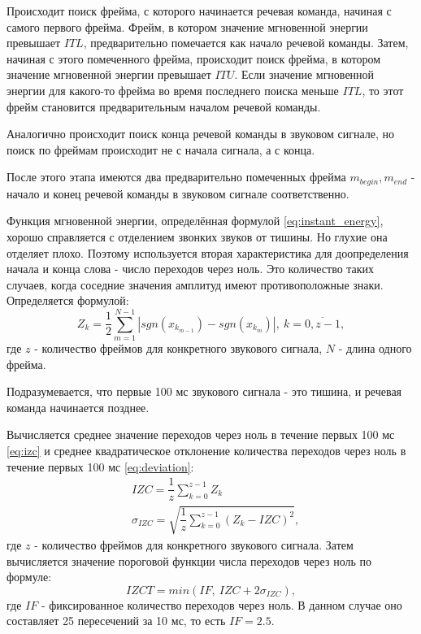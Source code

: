 Происходит поиск фрейма, с которого начинается речевая команда, начиная с самого первого фрейма. Фрейм, в котором значение мгновенной энергии превышает $ITL$, предварительно помечается как начало речевой команды. Затем, начиная с этого помеченного фрейма, происходит поиск фрейма, в котором значение мгновенной энергии превышает $ITU$. Если значение мгновенной энергии для какого-то фрейма во время последнего поиска меньше $ITL$, то этот фрейм становится предварительным началом речевой команды. 

Аналогично происходит поиск конца речевой команды в звуковом сигнале, но поиск по фреймам происходит не с начала сигнала, а с конца.

После этого этапа имеются два предварительно помеченных фрейма $m_{begin}, m_{end}$  - начало и конец речевой команды в звуковом сигнале соответственно.

Функция мгновенной энергии, определённая формулой \eqref{eq:instant_energy}, хорошо справляется с отделением звонких звуков от тишины. Но глухие она отделяет плохо. Поэтому используется вторая характеристика для доопределения начала и конца слова - число переходов через ноль. Это количество таких случаев, когда соседние значения амплитуд имеют противоположные знаки. Определяется формулой:
\begin{equation}
	Z_k = \dfrac{1}{2} \sum_{m=1}^{N-1} |sgn(x_{k_{m-1}}) - sgn(x_{k_m})|,~k=\overline{0,z-1},
\end{equation}
где $z$ - количество фреймов для конкретного звукового сигнала, $N$ - длина одного фрейма.

Подразумевается, что первые 100 мс звукового сигнала - это тишина, и речевая команда начинается позднее.

Вычисляется среднее значение переходов через ноль в течение первых 100 мс \eqref{eq:izc} и среднее квадратическое отклонение количества переходов через ноль в течение первых 100 мс \eqref{eq:deviation}:
\begin{align}
	\label{eq:izc}
	&IZC = \dfrac{1}{z} \sum_{k=0}^{z-1} Z_k \\
	\label{eq:deviation}
	&\sigma_{IZC} = \sqrt{\dfrac{1}{z} \sum_{k=0}^{z-1} (Z_k - IZC)^2},
\end{align}
где $z$ - количество фреймов для конкретного звукового сигнала.
Затем вычисляется значение пороговой функции числа переходов через ноль по формуле:
\begin{equation}
	IZCT = min(IF,~IZC + 2 \sigma_{IZC}),
\end{equation}
где $IF$ - фиксированное количество переходов через ноль. В данном случае оно составляет 25 пересечений за 10 мс, то есть $IF=2.5$. 

